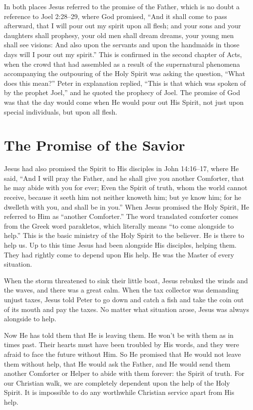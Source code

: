 In both places Jesus referred to the promise of the Father,
which is no doubt a reference to Joel 2:28–29, where God
promised, “And it shall come to pass afterward, that I
will pour out my spirit upon all flesh; and your sons and
your daughters shall prophesy, your old men shall dream
dreams, your young men shall see visions: And also upon
the servants and upon the handmaids in those days will I
pour out my spirit.” This is confirmed in the second chapter
of Acts, when the crowd that had assembled as a result of
the supernatural phenomena accompanying the outpouring
of the Holy Spirit was asking the question, “What does
this mean?” Peter in explanation replied, “This is that which
was spoken of by the prophet Joel,” and he quoted the
prophecy of Joel. The promise of God was that the day
would come when He would pour out His Spirit, not just
upon special individuals, but upon all flesh.


\section*{The Promise of the Savior}

Jesus had also promised the Spirit to His disciples in
John 14:16–17, where He said, “And I will pray the Father,
and he shall give you another Comforter, that he may abide
with you for ever; Even the Spirit of truth, whom the world
cannot receive, because it seeth him not neither knoweth
him; but ye know him; for he dwelleth with you, and
shall be in you.” When Jesus promised the Holy Spirit, He
referred to Him as “another Comforter.” The word translated
comforter comes from the Greek word parakletos, which
literally means “to come alongside to help.” This is the basic
ministry of the Holy Spirit to the believer. He is there to help
us. Up to this time Jesus had been alongside His disciples,
helping them. They had rightly come to depend upon His
help. He was the Master of every situation.

When the storm threatened to sink their little boat, Jesus
rebuked the winds and the waves, and there was a great
calm. When the tax collector was demanding unjust taxes,
Jesus told Peter to go down and catch a fish and take the
coin out of its mouth and pay the taxes. No matter what
situation arose, Jesus was always alongside to help.

Now He has told them that He is leaving them. He
won’t be with them as in times past. Their hearts must have
been troubled by His words, and they were afraid to face
the future without Him. So He promised that He would
not leave them without help, that He would ask the Father,
and He would send them another Comforter or Helper to
abide with them forever: the Spirit of truth. For our Christian
walk, we are completely dependent upon the help of
the Holy Spirit. It is impossible to do any worthwhile Christian
service apart from His help.


